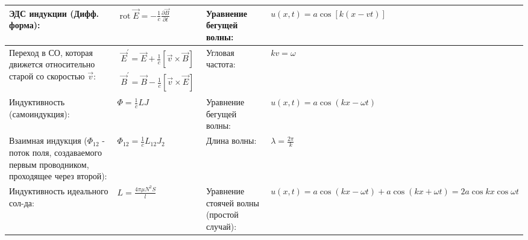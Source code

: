 \documentclass{article}
\begin{document}
\begin{tabular}{ |p{6cm}|p{3.5cm}|p{6cm}|p{3.5cm}|  }
\hline
ЭДС индукции (Дифф. форма):&
$\operatorname{rot} \vec{E}=-\frac{1}{c} \frac{\partial \vec{B}}{\partial t}$ &
Уравнение бегущей волны:&
$u(x, t)=a \cos [k(x-v t)]$\\
\hline
Переход в СО, которая движется относительно старой со скоростью $\vec{v}$: &
$\begin{aligned}
\vec{E}^{\prime}=\vec{E}+\frac{1}{c} [\vec{v} \times \vec{B}] \\
\vec{B}^{\prime}=\vec{B}-\frac{1}{c} [\vec{v} \times \vec{E}]
\end{aligned}$&
Угловая частота: &
$k v=\omega$ \\
\hline
Индуктивность (самоиндукция): &
$\Phi=\frac{1}{c} L J$ &
Уравнение бегущей волны:&
$u(x, t)=a \cos (k x-\omega t)$\\
\hline
Взаимная индукция ($\Phi_{12}$ - поток поля, создаваемого первым проводником, проходящее через второй): &
$\Phi_{12}=\frac{1}{c} L_{12} J_{2}$ &
Длина волны: &
$\lambda=\frac{2 \pi}{k}$\\
\hline
Индуктивность идеального сол-да: &
$L=\frac{4 \pi \mu N^{2} S}{l}$ &
Уравнение стоячей волны (простой случай):&
$u(x, t)=a \cos (k x-\omega t)+a \cos (k x+\omega t)=2 a \cos k x \cos \omega t$\\
\hline
\end{tabular}

\newpage
\end{document}
